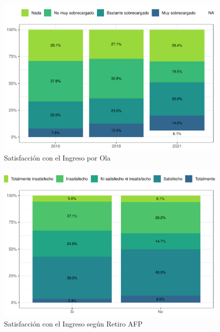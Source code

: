 \documentclass[
  12pt,
]{book}
\begin{document}
\begin{figure}

{\centering \includegraphics{reporte-elsoc_files/figure-latex/satisfaccion-wave-1} 

}

\caption{Satisfacción con el Ingreso por Ola}\label{fig:satisfaccion-wave}
\end{figure}

\begin{figure}

{\centering \includegraphics{reporte-elsoc_files/figure-latex/satisfaccion-retiro-1} 

}

\caption{Satisfacción con el Ingreso según Retiro AFP}\label{fig:satisfaccion-retiro}
\end{figure}
\end{document}
